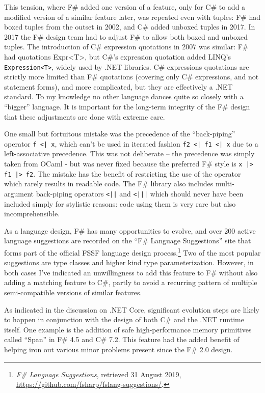 \documentclass[acmsmall,review]{acmart}\settopmatter{printfolios=true,printccs=false,printacmref=false}
\begin{document}
This tension, where F\# added one version of a feature, only for C\# to add a modified version of a similar
feature later, was repeated even with tuples: F\# had boxed tuples from the outset in 2002,
and C\# added unboxed tuples in 2017.  In 2017 the F\# design team had to
adjust F\# to allow both boxed and unboxed tuples. The introduction of C\# expression quotations in
2007 was similar: F\# had quotations Expr<T>, but C\#’s expression quotation added
LINQ’s \texttt{Expression<T>}, widely used by .NET libraries. C\# expressions quotations are strictly
more limited than F\# quotations (covering only C\# expressions, and not statement forms), and
more complicated, but they are effectively a .NET standard.  To my knowledge no other language
dances quite so closely with a “bigger” language. It is important for the long-term integrity of the F\# design
that these adjustments are done with extreme care.

One small but fortuitous mistake was the precedence of the “back-piping”
operator \verb$f <| x$, which can’t be used in iterated fashion \verb$f2 <| f1 <| x$ due to
a left-associative precedence. This was not deliberate – the precedence was simply
taken from OCaml - but was never fixed because the preferred F\# style is  \verb$x |> f1 |> f2$. The
mistake has the benefit of restricting the use of the operator which rarely results in readable code. The F\# library also includes
multi-argument back-piping operators \verb$<||$ and \verb$<|||$ which should never have been included simply for
stylistic reasons: code using them is very rare but also incomprehensible.

As a language design, F\# has many opportunities to evolve, and over 200 active language
suggestions are recorded on the “F\# Language Suggestions” site that forms part of the
official FSSF language design process.\footnote{\textit{F\# Language Suggestions}, retrieved 31 August 2019, \url{https://github.com/fsharp/fslang-suggestions/}.}
Two of the most popular suggestions are type classes
and higher kind type parameterization. However, in both cases I’ve indicated an unwillingness
to add this feature to F\# without also adding a matching feature to C\#, partly to avoid a
recurring pattern of multiple semi-compatible versions of similar features.

As indicated in the discussion on .NET Core, significant evolution steps are likely to happen in
conjunction with the design of both C\# and the .NET runtime itself.  One example is the addition
of safe high-performance memory primitives called “Span” in F\# 4.5 and C\# 7.2.  This feature
had the added benefit of helping iron out various minor problems present since the F\# 2.0 design.
\end{document}
